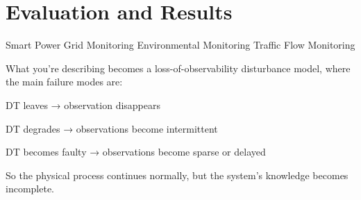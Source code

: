 \chapter{Evaluation and Results}\label{ch:results}





Smart Power Grid Monitoring
Environmental Monitoring
Traffic Flow Monitoring


What you’re describing becomes a loss-of-observability disturbance model, where the main failure modes are:

DT leaves → observation disappears

DT degrades → observations become intermittent

DT becomes faulty → observations become sparse or delayed

So the physical process continues normally, but the system’s knowledge becomes incomplete.




